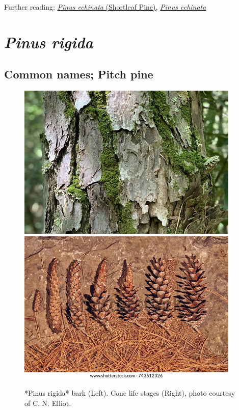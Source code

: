 \documentclass[
]{article}
\begin{document}
Further reading; \href{https://www.gardenia.net/plant/pinus-echinata}{\emph{Pinus echinata} (Shortleaf Pine)}, \href{https://plants.ces.ncsu.edu/plants/pinus-echinata/}{\emph{Pinus echinata}}

\hypertarget{pinus-rigida}{%
\section{\texorpdfstring{\emph{Pinus rigida}}{Pinus rigida}}\label{pinus-rigida}}

\hypertarget{common-names-pitch-pine}{%
\subsection{Common names; Pitch pine}\label{common-names-pitch-pine}}

\begin{figure}

{\centering \includegraphics[width=0.5\linewidth]{p rigida bark} \includegraphics[width=0.5\linewidth]{pitch pine cones} 

}

\caption{*Pinus rigida* bark (Left). Cone life stages (Right), photo courtesy of C. N. Elliot.}\label{fig:rigida}
\end{figure}
\end{document}
